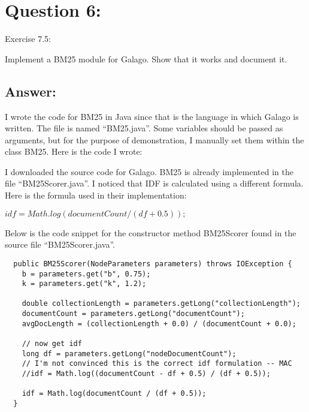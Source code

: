\section*{Question 6:}
Exercise 7.5: 

Implement a BM25 module for Galago. Show that it works and document
it.

\subsection*{Answer:}

I wrote the code for BM25 in Java since that is the language in which Galago is written. The file is named ``BM25.java''. Some variables should be passed as arguments, but for the purpose of demonstration, I manually set them within the class BM25. Here is the code I wrote:



I downloaded the source code for Galago. BM25 is already implemented in the file ``BM25Scorer.java''. I noticed that IDF is calculated using a different formula. Here is the formula used in their implementation:

$idf = Math.log(documentCount / (df + 0.5));$

Below is the code snippet for the constructor method BM25Scorer found in the source file ``BM25Scorer.java''.

\begin{lstlisting}
  public BM25Scorer(NodeParameters parameters) throws IOException {
    b = parameters.get("b", 0.75);
    k = parameters.get("k", 1.2);

    double collectionLength = parameters.getLong("collectionLength");
    documentCount = parameters.getLong("documentCount");
    avgDocLength = (collectionLength + 0.0) / (documentCount + 0.0);

    // now get idf
    long df = parameters.getLong("nodeDocumentCount");
    // I'm not convinced this is the correct idf formulation -- MAC
    //idf = Math.log((documentCount - df + 0.5) / (df + 0.5));
    
    idf = Math.log(documentCount / (df + 0.5));
  }
\end{lstlisting}
